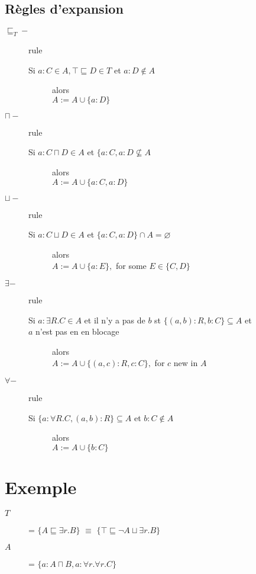 \subsection{Règles d'expansion}
\begin{description}
\item[$\sqsubseteq_{T} -$] rule\\
\begin{description}
\item[Si $a : C \in A, \top \sqsubseteq D \in T$ et $a : D \notin A$] alors\\ $A := A \cup \{ a : D \}$
\end{description}
\item[$\sqcap -$]rule\\
\begin{description}
\item[Si $a : C \sqcap D \in A$ et $\{ a : C, a : D \nsubseteq A$] alors\\ $A := A \cup \{ a : C, a : D\}$
\end{description}
\item[$\sqcup -$]rule\\
\begin{description}
\item[Si $a : C \sqcup D \in A$ et $\{ a : C, a : D \} \cap A = \varnothing$] alors\\ $A := A \cup \{a : E\},$ for some $E \in \{C,D\}$
\end{description}
\item[$\exists -$]rule\\
\begin{description}
\item[Si $a : \exists R.C \in A$ et il n'y a pas de $b$ st $\{(a,b) : R, b : C\} \subseteq A$ et]
\item[$a $ n'est pas en en blocage] alors\\ $A := A \cup \{(a,c) : R,c : C \},$ for $c$ new in $A$
\end{description}
\item[$\forall -$]rule\\
\begin{description}
\item[Si $\{a : \forall R.C, (a,b) : R\} \subseteq A$ et $b : C \notin A$] alors\\ $A := A \cup \{b : C \}$
\end{description}
\end{description}
\pagebreak
\section{Exemple}
\begin{description}
\item[$T$] = $\{ A \sqsubseteq \exists r.B \}$ $\equiv$ $\{\top \sqsubseteq \neg A \sqcup \exists r.B \}$
\item[$A$] = $\{a : A \sqcap B, a : \forall r.\forall r.C \}$
\end{description}

